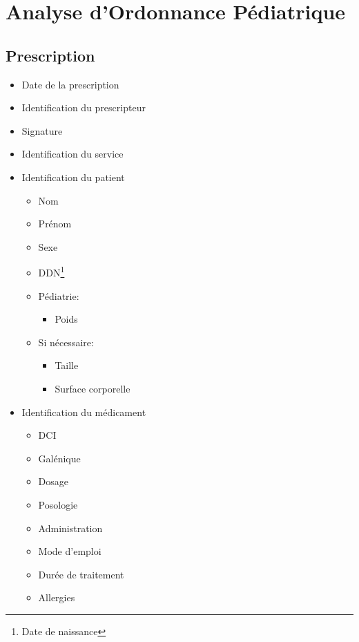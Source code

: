 \documentclass[11pt]{article}
\begin{document}
\section{Analyse d'Ordonnance Pédiatrique}
\label{sec:org5af7cb3}
\setlength{\parindent}{0pt}
\subsection{Prescription}
\label{sec:org62a31cc}
\begin{itemize}
\item Date de la prescription
\item Identification du prescripteur
\item Signature
\item Identification du service
\item Identification du patient
\begin{itemize}
\item Nom
\item Prénom
\item Sexe
\item DDN\footnote{Date de naissance}
\item Pédiatrie:
\begin{itemize}
\item Poids
\end{itemize}
\item Si nécessaire:
\begin{itemize}
\item Taille
\item Surface corporelle
\end{itemize}
\end{itemize}
\item Identification du médicament
\begin{itemize}
\item DCI
\item Galénique
\item Dosage
\item Posologie
\item Administration
\item Mode d'emploi
\item Durée de traitement
\item Allergies
\end{itemize}
\end{itemize}
\end{document}
